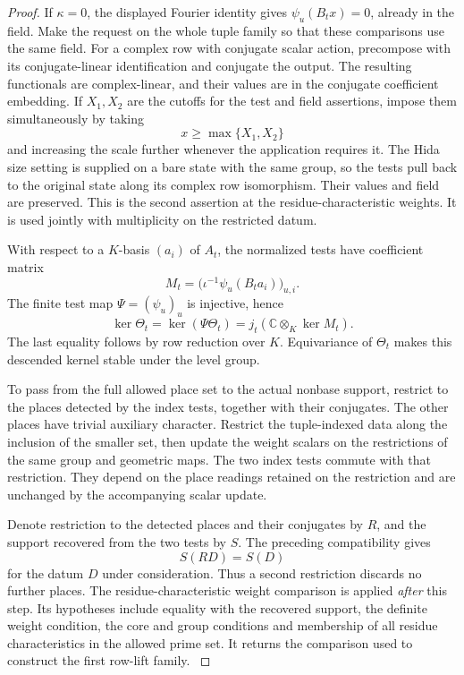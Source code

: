 \begin{proof}
If \(\kappa=0\), the displayed Fourier identity gives
\(\psi_u(B_tx)=0\), already in the field. Make the request on the whole
tuple family so that these comparisons use the same field.
For a complex row with conjugate scalar action, precompose
with its conjugate-linear identification and conjugate the
output. The resulting functionals are complex-linear, and
their values are in the conjugate coefficient embedding.
If \(X_1,X_2\) are the cutoffs for the test and field assertions, impose them simultaneously by taking
\[
 x\ge \max\{X_1,X_2\}
\]
and increasing the scale further whenever the application requires it. The Hida size setting is supplied
on a bare state with the same group, so the tests pull back
to the original state along its complex row isomorphism.
Their values and field are preserved. This is the second
assertion at the residue-characteristic weights. It is used
jointly with multiplicity on the restricted datum.
\label{cor:automorphic-realization-12}

With respect to a \(K\)-basis \((a_i)\) of \(A_t\), the normalized
tests have coefficient matrix
\[
               M_t=\big(\iota^{-1}\psi_u(B_ta_i)\big)_{u,i}.
\]
The finite test map \(\Psi=(\psi_u)_u\) is injective, hence
\[
 \ker\Theta_t=\ker(\Psi\Theta_t)=j_t(\mathbb C\otimes_K\ker M_t).
\]
The last equality follows by row reduction over \(K\). Equivariance
of \(\Theta_t\) makes this descended kernel stable under the level group.

To pass from the full allowed place set to the actual nonbase
support, restrict to the places detected by the index tests,
together with their conjugates. The other places have trivial
auxiliary character. Restrict the tuple-indexed data along
the inclusion of the smaller set, then update the weight
scalars on the restrictions of the same group and geometric
maps. The two index tests commute with that restriction.
They depend on the place readings retained on the restriction
and are unchanged by the accompanying scalar update.

Denote restriction to the detected places and their conjugates by \(R\), and the support recovered from the two tests by \(S\). The preceding compatibility gives
\[
 S(RD)=S(D)
\]
for the datum \(D\) under consideration. Thus a second restriction discards no further places. The residue-characteristic weight comparison is
applied \emph{after} this step. Its hypotheses include equality
with the recovered support, the definite weight condition,
the core and group conditions and membership of all residue
characteristics in the allowed prime set. It returns the
comparison used to construct the first row-lift family.
\label{cor:automorphic-realization-13}


\end{proof}
